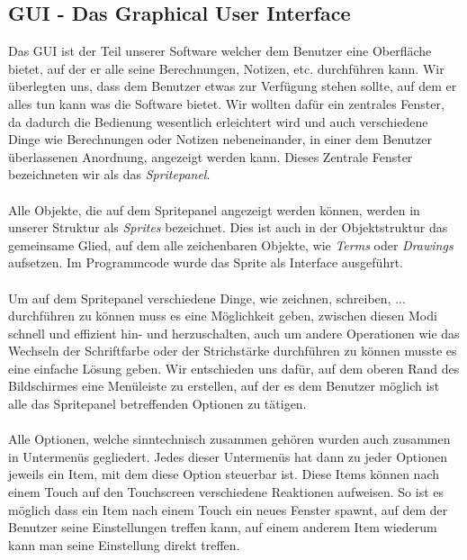 \subsection{GUI - Das Graphical User Interface}

Das GUI ist der Teil unserer Software welcher dem Benutzer eine Oberfläche bietet, auf der er alle seine Berechnungen, Notizen, etc. durchführen kann. Wir überlegten uns, dass dem Benutzer etwas zur Verfügung stehen sollte, auf dem er alles tun kann was die Software bietet. Wir wollten dafür ein zentrales Fenster, da dadurch die Bedienung wesentlich erleichtert wird und auch verschiedene Dinge wie Berechnungen oder Notizen nebeneinander, in einer dem Benutzer überlassenen Anordnung, angezeigt werden kann. Dieses Zentrale Fenster bezeichneten wir als das \textit{Spritepanel}.\\
\\
Alle Objekte, die auf dem Spritepanel angezeigt werden können, werden in unserer Struktur als \textit{Sprites} bezeichnet. Dies ist auch in der Objektstruktur das gemeinsame Glied, auf dem alle zeichenbaren Objekte, wie \textit{Terms} oder \textit{Drawings} aufsetzen. Im Programmcode wurde das Sprite als Interface ausgeführt.\\
\\
Um auf dem Spritepanel verschiedene Dinge, wie zeichnen, schreiben, ... durchführen zu können muss es eine Möglichkeit geben, zwischen diesen Modi schnell und effizient hin- und herzuschalten, auch um andere Operationen wie das Wechseln der Schriftfarbe oder der Strichstärke durchführen zu können musste es eine einfache Lösung geben. Wir entschieden uns dafür, auf dem oberen Rand des Bildschirmes eine Menüleiste zu erstellen, auf der es dem Benutzer möglich ist alle das Spritepanel betreffenden Optionen zu tätigen.\\
\\
Alle Optionen, welche sinntechnisch zusammen gehören wurden auch zusammen in Untermenüs gegliedert. Jedes dieser Untermenüs hat dann zu jeder Optionen jeweils ein Item, mit dem diese Option steuerbar ist. Diese Items können nach einem Touch auf den Touchscreen verschiedene Reaktionen aufweisen. So ist es möglich dass ein Item nach einem Touch ein neues Fenster spawnt, auf dem der Benutzer seine Einstellungen treffen kann, auf einem anderem Item wiederum kann man seine Einstellung direkt treffen.